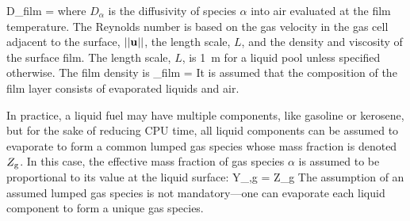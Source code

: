 \be
   D_{\rm film} = 
\ee
where $D_\alpha$ is the diffusivity of species $\alpha$ into air evaluated at the film temperature. The Reynolds number is based on the gas velocity in the gas cell adjacent to the surface, $||{\mathbf{u}}||$, the length scale, $L$, and the density and viscosity of the surface film. The length scale, $L$, is 1~m for a liquid pool unless specified otherwise. The film density is
\be
   \rho_{\rm film} = 
\ee
It is assumed that the composition of the film layer consists of evaporated liquids and air.

In practice, a liquid fuel may have multiple components, like gasoline or kerosene, but for the sake of reducing CPU time, all liquid components can be assumed to evaporate to form a common lumped gas species whose mass fraction is denoted $Z_{\rm g}$. In this case, the effective mass fraction of gas species $\alpha$ is assumed to be proportional to its value at the liquid surface:
\be
   Y_{\rm \alpha,g} = Z_{\rm g} 
\ee
The assumption of an assumed lumped gas species is not mandatory---one can evaporate each liquid component to form a unique gas species.

